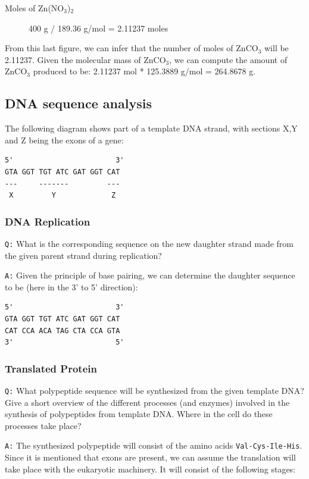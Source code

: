 \documentclass[11pt, a4paper,titlepage]{article}
\begin{document}
\begin{description}
\item[Moles of Zn(NO$_{3}$)$_{2}$] 400 g / 189.36 g/mol = 2.11237 moles
\end{description}

From this last figure, we can infer that the number of moles of
ZnCO$_{3}$ will be 2.11237. Given the molecular mass of ZnCO$_{3}$, we can
compute the amount of ZnCO$_{3}$ produced to be: 2.11237 mol * 125.3889
g/mol = 264.8678 g.
\subsection{DNA sequence analysis}
\label{sec-1-2}


The following diagram shows part of a template DNA strand, with
sections X,Y and Z being the exons of a gene:


\begin{verbatim}
5'                        3'
GTA GGT TGT ATC GAT GGT CAT
---     -------         ---
 X         Y             Z
\end{verbatim}
\subsubsection{DNA Replication}
\label{sec-1-2-1}

\texttt{Q:} What is the corresponding sequence on the new daughter strand
made from the given parent strand during replication?

\texttt{A:} Given the principle of base pairing, we can determine the daughter
sequence to be (here in the 3' to 5' direction):


\begin{verbatim}
5'                        3'
GTA GGT TGT ATC GAT GGT CAT
CAT CCA ACA TAG CTA CCA GTA
3'                        5'
\end{verbatim}
\subsubsection{Translated Protein}
\label{sec-1-2-2}

\texttt{Q:} What polypeptide sequence will be synthesized from the given template
DNA? Give a short overview of the different processes (and enzymes)
involved in the synthesis of polypeptides from template DNA. Where in
the cell do these processes take place?

\texttt{A:} The synthesized polypeptide will consist of the amino acids
\texttt{Val-Cys-Ile-His}. Since it is mentioned that exons are present, we
can assume the translation will take place with the eukaryotic
machinery. It will consist of the following stages:
\end{document}
